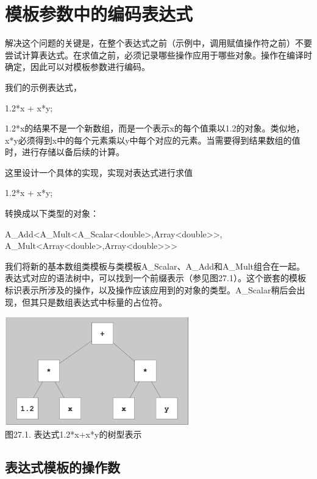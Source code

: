 \section{模板参数中的编码表达式}

解决这个问题的关键是，在整个表达式之前（示例中，调用赋值操作符之前）不要尝试计算表达式。在求值之前，必须记录哪些操作应用于哪些对象。操作在编译时确定，因此可以对模板参数进行编码。

我们的示例表达式，

\begin{cpp}
1.2*x + x*y;
\end{cpp}

1.2*x的结果不是一个新数组，而是一个表示x的每个值乘以1.2的对象。类似地，x*y必须得到x中的每个元素乘以y中每个对应的元素。当需要得到结果数组的值时，进行存储以备后续的计算。

这里设计一个具体的实现，实现对表达式进行求值

\begin{cpp}
1.2*x + x*y;
\end{cpp}

转换成以下类型的对象：

\begin{cpp}
A_Add<A_Mult<A_Scalar<double>,Array<double>>,
	  A_Mult<Array<double>,Array<double>>>
\end{cpp}

我们将新的基本数组类模板与类模板A\_Scalar、A\_Add和A\_Mult组合在一起。表达式对应的语法树中，可以找到一个前缀表示（参见图27.1）。这个嵌套的模板标识表示所涉及的操作，以及操作应该应用到的对象的类型。A\_Scalar稍后会出现，但其只是数组表达式中标量的占位符。

\begin{center}
\includegraphics[width=0.6\textwidth]{part3/ch27/images/1.png} \\
图27.1. 表达式1.2*x+x*y的树型表示
\end{center}

\subsection{表达式模板的操作数}

